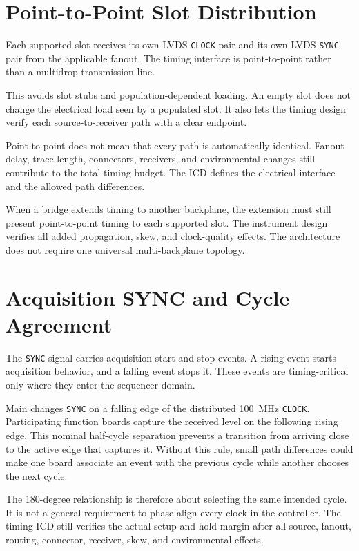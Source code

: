 \section{Point-to-Point Slot Distribution}

Each supported slot receives its own LVDS \texttt{CLOCK} pair and its own LVDS \texttt{SYNC} pair from the applicable fanout. The timing interface is point-to-point rather than a multidrop transmission line.

This avoids slot stubs and population-dependent loading. An empty slot does not change the electrical load seen by a populated slot. It also lets the timing design verify each source-to-receiver path with a clear endpoint.

Point-to-point does not mean that every path is automatically identical. Fanout delay, trace length, connectors, receivers, and environmental changes still contribute to the total timing budget. The ICD defines the electrical interface and the allowed path differences.

When a bridge extends timing to another backplane, the extension must still present point-to-point timing to each supported slot. The instrument design verifies all added propagation, skew, and clock-quality effects. The architecture does not require one universal multi-backplane topology.

\section{Acquisition SYNC and Cycle Agreement}

The \texttt{SYNC} signal carries acquisition start and stop events. A rising event starts acquisition behavior, and a falling event stops it. These events are timing-critical only where they enter the sequencer domain.

Main changes \texttt{SYNC} on a falling edge of the distributed 100~MHz \texttt{CLOCK}. Participating function boards capture the received level on the following rising edge. This nominal half-cycle separation prevents a transition from arriving close to the active edge that captures it. Without this rule, small path differences could make one board associate an event with the previous cycle while another chooses the next cycle.

The 180-degree relationship is therefore about selecting the same intended cycle. It is not a general requirement to phase-align every clock in the controller. The timing ICD still verifies the actual setup and hold margin after all source, fanout, routing, connector, receiver, skew, and environmental effects.

